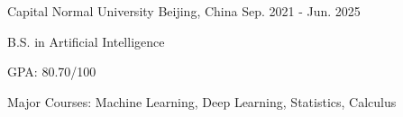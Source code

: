 

\begin{cventries}

  \cventry
    {} %
    {Capital Normal University} %
    {Beijing, China} %
    {Sep. 2021 - Jun. 2025} %
    {
      \begin{cvitems} %
        \item{B.S. in Artificial Intelligence}
        \item {GPA: 80.70/100}
        \item {Major Courses: Machine Learning, Deep Learning, Statistics, Calculus}
      \end{cvitems}
    }

\end{cventries}
